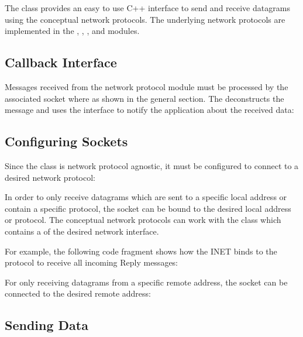 The  class provides an easy to use C++ interface to send and
receive datagrams using the conceptual network protocols. The underlying network
protocols are implemented in the ,
, , and
 modules.

\subsection*{Callback Interface}

Messages received from the network protocol module must be processed by the
associated socket where as shown in the general section. The 
deconstructs the message and uses the  interface
to notify the application about the received data:


\subsection*{Configuring Sockets}

Since the  class is network protocol agnostic, it must be
configured to connect to a desired network protocol:


In order to only receive datagrams which are sent to a specific local address or
contain a specific protocol, the socket can be bound to the desired local
address or protocol. The conceptual network protocols can work with the
 class which contains a  of the desired
network interface.

For example, the following code fragment shows how the INET 
binds to the  protocol to receive all incoming 
Reply messages:


For only receiving datagrams from a specific remote address, the socket can be
connected to the desired remote address:


\subsection*{Sending Data}

